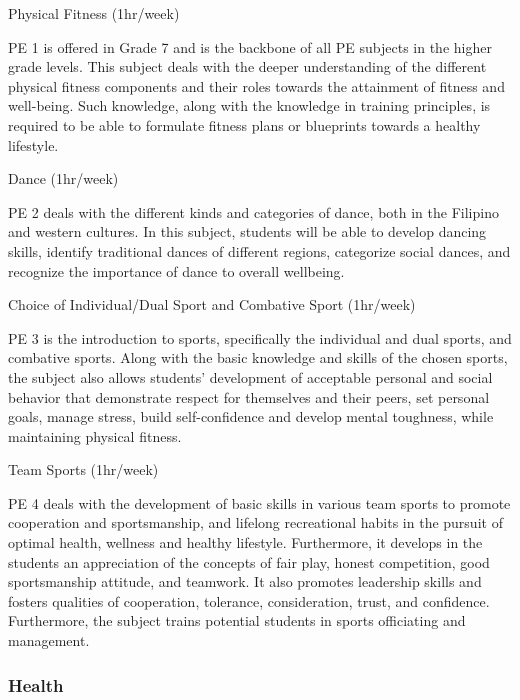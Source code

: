 \begin{subject}
	Physical Fitness 
	\hfill
	(1hr/week)
\end{subject}
PE 1 is offered in Grade 7 and is the backbone of all PE subjects in the higher grade levels. This subject deals with the deeper understanding of the different physical fitness components and their roles towards the attainment of fitness and well-being. Such knowledge, along with the knowledge in training principles, is required to be able to formulate fitness plans or blueprints towards a healthy lifestyle. 

\begin{subject}
	Dance 
	\hfill
	(1hr/week)
\end{subject}
PE 2 deals with the different kinds and categories of dance, both in the Filipino and western cultures. In this subject, students will be able to develop dancing skills, identify traditional dances of different regions, categorize social dances, and recognize the importance of dance to overall wellbeing. 

\begin{subject}
	Choice of Individual/Dual Sport and Combative Sport
	\hfill
	(1hr/week)
\end{subject}
PE 3 is the introduction to sports, specifically the individual and dual sports, and combative sports. Along with the basic knowledge and skills of the chosen sports, the subject also allows students’ development of acceptable personal and social behavior that demonstrate respect for themselves and their peers, set personal goals, manage stress, build self-confidence and develop mental toughness, while maintaining physical fitness.

\begin{subject}
	Team Sports
	\hfill
	(1hr/week)
\end{subject}
PE 4 deals with the development of basic skills in various team sports to promote cooperation and sportsmanship, and lifelong recreational habits in the pursuit of optimal health, wellness and healthy lifestyle. Furthermore, it develops in the students an appreciation of the concepts of fair play, honest competition, good sportsmanship attitude, and teamwork. It also promotes leadership skills and fosters qualities of cooperation, tolerance, consideration, trust, and confidence. Furthermore, the subject trains potential students in sports officiating and management. 

\subsubsection{\textbf{Health}}

